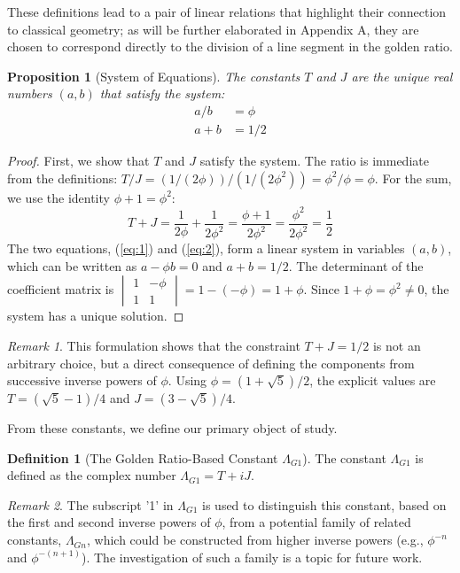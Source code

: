 \documentclass{amsart}
\theoremstyle{plain}
\newtheorem{proposition}[theorem]{Proposition}
\theoremstyle{definition}
\newtheorem{definition}[theorem]{Definition}
\theoremstyle{remark}
\newtheorem*{remark}{Remark}
\newcommand{\LambdaG}{\Lambda_{G1}}
\newcommand{\phiG}{\phi}
\begin{document}
These definitions lead to a pair of linear relations that highlight their connection to classical geometry; as will be further elaborated in Appendix A, they are chosen to correspond directly to the division of a line segment in the golden ratio.
\begin{proposition}[System of Equations]
The constants $T$ and $J$ are the unique real numbers $(a,b)$ that satisfy the system:
\begin{align}
    a/b &= \phiG \label{eq:1} \\
    a+b &= 1/2 \label{eq:2}
\end{align}
\end{proposition}
\begin{proof}
First, we show that $T$ and $J$ satisfy the system. The ratio is immediate from the definitions: $T/J = (1/(2\phiG))/(1/(2\phiG^2)) = \phiG^2/\phiG = \phiG$. For the sum, we use the identity $\phiG+1 = \phiG^2$:
\[ T+J = \frac{1}{2\phiG} + \frac{1}{2\phiG^2} = \frac{\phiG+1}{2\phiG^2} = \frac{\phiG^2}{2\phiG^2} = \frac{1}{2} \] 
The two equations, (\ref{eq:1}) and (\ref{eq:2}), form a linear system in variables $(a,b)$, which can be written as $a - \phiG b = 0$ and $a+b=1/2$. The determinant of the coefficient matrix is $\begin{vmatrix} 1 & -\phiG \\ 1 & 1 \end{vmatrix} = 1 - (-\phiG) = 1+\phiG$. Since $1+\phiG = \phiG^2 \neq 0$, the system has a unique solution.
\end{proof}

\begin{remark}
This formulation shows that the constraint $T+J=1/2$ is not an arbitrary choice, but a direct consequence of defining the components from successive inverse powers of $\phiG$. Using $\phiG = (1+\sqrt{5})/2$, the explicit values are $T = (\sqrt{5}-1)/4$ and $J = (3-\sqrt{5})/4$.
\end{remark}

From these constants, we define our primary object of study.
\begin{definition}[The Golden Ratio-Based Constant \texorpdfstring{$\LambdaG$}{Lambda\_G1}]
The constant $\LambdaG$ is defined as the complex number $\LambdaG = T+iJ$.
\end{definition}

\begin{remark}
The subscript '1' in $\LambdaG$ is used to distinguish this constant, based on the first and second inverse powers of $\phiG$, from a potential family of related constants, $\Lambda_{Gn}$, which could be constructed from higher inverse powers (e.g., $\phiG^{-n}$ and $\phiG^{-(n+1)}$). The investigation of such a family is a topic for future work.
\end{remark}
\end{document}
